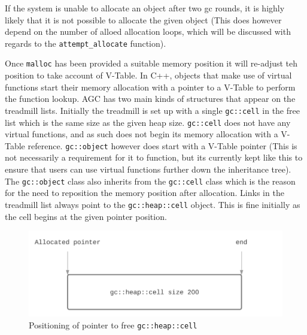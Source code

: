 \documentclass[11pt]{article}
\begin{document}
If the system is unable to allocate an object after two gc rounds, it is highly likely
that it is not possible to allocate the given object (This does however depend on the
number of alloed allocation loops, which will be discussed with regards to the
\texttt{attempt\_allocate} function).

Once \texttt{malloc} has been provided a suitable memory position it will re-adjust
teh position to take account of V-Table. In C++, objects that make use of virtual
functions start their memory allocation with a pointer to a V-Table to perform the
function lookup. AGC has two main kinds of structures that appear on the treadmill lists.
Initially the treadmill is set up with a single \texttt{gc::cell} in the free list
which is the same size as the given heap size. \texttt{gc::cell} does not have any virtual
functions, and as such does not begin its memory allocation with a V-Table reference.
\texttt{gc::object} however does start with a V-Table pointer (This is not necessarily
a requirement for it to function, but its currently kept like this to ensure that 
users can use virtual functions further down the inheritance tree).
The \texttt{gc::object} class also inherits from the \texttt{gc::cell} class which is the
reason for the need to reposition the memory position after allocation.
Links in the treadmill list always point to the \texttt{gc::heap::cell} object.
This is fine initially as the cell begins at the given pointer position.
\begin{figure}
\begin{center}
\includegraphics[scale=0.5]{./report_srcs/free_cell_allocation.png}
\end{center}
\caption{Positioning of pointer to free \texttt{gc::heap::cell}}
\label{fig:freecell}
\end{figure}
\end{document}
